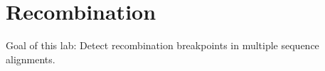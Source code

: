 \chapter{Recombination}

Goal of this lab:
Detect recombination breakpoints in multiple sequence alignments.

